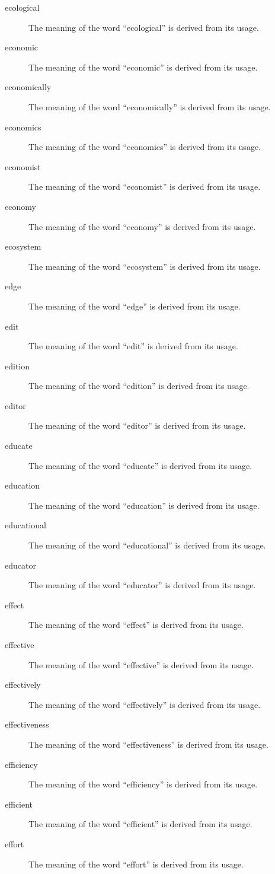 \documentclass[12pt, letterpaper]{memoir}
\begin{document}
\begin{description}
\item[ecological] The meaning of the word ``ecological'' is derived from its usage.
\item[economic] The meaning of the word ``economic'' is derived from its usage.
\item[economically] The meaning of the word ``economically'' is derived from its usage.
\item[economics] The meaning of the word ``economics'' is derived from its usage.
\item[economist] The meaning of the word ``economist'' is derived from its usage.
\item[economy] The meaning of the word ``economy'' is derived from its usage.
\item[ecosystem] The meaning of the word ``ecosystem'' is derived from its usage.
\item[edge] The meaning of the word ``edge'' is derived from its usage.
\item[edit] The meaning of the word ``edit'' is derived from its usage.
\item[edition] The meaning of the word ``edition'' is derived from its usage.
\item[editor] The meaning of the word ``editor'' is derived from its usage.
\item[educate] The meaning of the word ``educate'' is derived from its usage.
\item[education] The meaning of the word ``education'' is derived from its usage.
\item[educational] The meaning of the word ``educational'' is derived from its usage.
\item[educator] The meaning of the word ``educator'' is derived from its usage.
\item[effect] The meaning of the word ``effect'' is derived from its usage.
\item[effective] The meaning of the word ``effective'' is derived from its usage.
\item[effectively] The meaning of the word ``effectively'' is derived from its usage.
\item[effectiveness] The meaning of the word ``effectiveness'' is derived from its usage.
\item[efficiency] The meaning of the word ``efficiency'' is derived from its usage.
\item[efficient] The meaning of the word ``efficient'' is derived from its usage.
\item[effort] The meaning of the word ``effort'' is derived from its usage.

\end{description}
\end{document}
